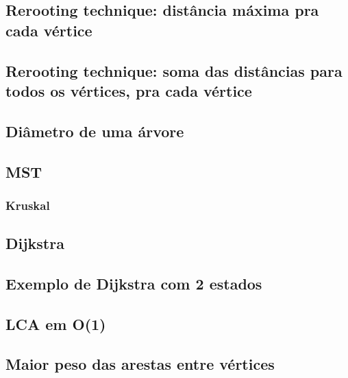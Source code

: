 \subsection{Rerooting technique: distância máxima pra cada vértice}


\subsection{Rerooting technique: soma das distâncias para todos os vértices, pra cada vértice}


\subsection{Diâmetro de uma árvore}


\subsection{MST}

\subsubsection{Kruskal}


\subsection{Dijkstra} 


\subsection{Exemplo de Dijkstra com 2 estados}


\subsection{LCA em O(1)}


\subsection{Maior peso das arestas entre vértices}
